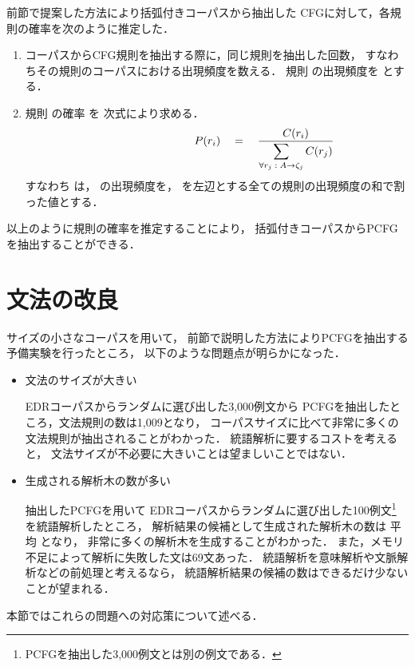 前節で提案した方法により括弧付きコーパスから抽出した
CFGに対して，各規則の確率を次のように推定した．

\newpage
\begin{flushleft}
  \vspace*{2mm}{\bf 【規則の確率の推定】}\vspace*{-3mm}
\end{flushleft}

\begin{enumerate}
\item
  コーパスからCFG規則を抽出する際に，同じ規則を抽出した回数，
  すなわちその規則のコーパスにおける出現頻度を数える．
  規則  の出現頻度を  とする．

\item
  規則  の確率  を
  次式により求める．
  \begin{equation}
    
    \hspace*{30mm}
    P(r_i) \quad = \quad 
      \frac{C(r_i)}
           {\displaystyle
            \sum_{\forall r_j \;:\; A \rightarrow \zeta_j} C(r_j)}
  \end{equation}
  すなわち  は， の出現頻度を，
   を左辺とする全ての規則の出現頻度の和で割った値とする．
\end{enumerate}

以上のように規則の確率を推定することにより，
括弧付きコーパスからPCFGを抽出することができる．
\section{文法の改良}


サイズの小さなコーパスを用いて，
前節で説明した方法によりPCFGを抽出する予備実験を行ったところ，
以下のような問題点が明らかになった．

\begin{itemize}


\item 文法のサイズが大きい

  \quad EDRコーパスからランダムに選び出した3,000例文から
  PCFGを抽出したところ，文法規則の数は1,009となり，
  コーパスサイズに比べて非常に多くの文法規則が抽出されることがわかった．
  統語解析に要するコストを考えると，
  文法サイズが不必要に大きいことは望ましいことではない．

\item 生成される解析木の数が多い

  \quad 抽出したPCFGを用いて
  EDRコーパスからランダムに選び出した100例文\footnote{
    PCFGを抽出した3,000例文とは別の例文である．
    }
  を統語解析したところ，
  解析結果の候補として生成された解析木の数は
  平均  となり，
  非常に多くの解析木を生成することがわかった．
  また，メモリ不足によって解析に失敗した文は69文あった．
  統語解析を意味解析や文脈解析などの前処理と考えるなら，
  統語解析結果の候補の数はできるだけ少ないことが望まれる．
\end{itemize}
本節ではこれらの問題への対応策について述べる．



